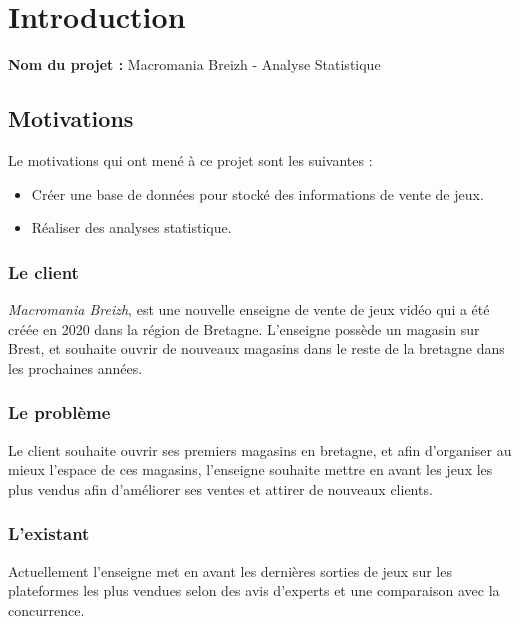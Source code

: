 \documentclass[french]{article}
\begin{document}
\begin{titlepage}
\vfill

\end{titlepage}

\newpage

\tableofcontents

\newpage

\section{Introduction}

\textbf{Nom du projet :} Macromania Breizh - Analyse Statistique

\subsection{Motivations}

Le motivations qui ont mené à ce projet sont les suivantes :

\begin{itemize}
    \item Créer une base de données pour stocké des informations de vente de jeux.
    \item Réaliser des analyses statistique.
\end{itemize}

\subsubsection{Le client}

\textit{Macromania Breizh}, est une nouvelle enseigne de vente de jeux vidéo qui a été créée en 2020 dans la région de Bretagne. L’enseigne possède un magasin sur Brest, et souhaite ouvrir de nouveaux magasins dans le reste de la bretagne dans les prochaines années.

\subsubsection{Le problème}

Le client souhaite ouvrir ses premiers magasins en bretagne, et afin d’organiser au mieux l’espace de ces magasins, l’enseigne souhaite mettre en avant les jeux les plus vendus afin d’améliorer ses ventes et attirer de nouveaux clients.

\subsubsection{L'existant}

Actuellement l’enseigne met en avant les dernières sorties de jeux sur les plateformes les plus vendues selon des avis d’experts et une comparaison avec la concurrence.
\end{document}
